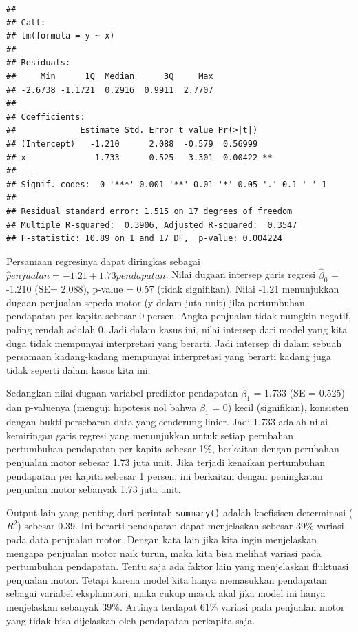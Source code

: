 \documentclass[
]{book}
\begin{document}
\begin{verbatim}
## 
## Call:
## lm(formula = y ~ x)
## 
## Residuals:
##     Min      1Q  Median      3Q     Max 
## -2.6738 -1.1721  0.2916  0.9911  2.7707 
## 
## Coefficients:
##             Estimate Std. Error t value Pr(>|t|)   
## (Intercept)   -1.210      2.088  -0.579  0.56999   
## x              1.733      0.525   3.301  0.00422 **
## ---
## Signif. codes:  0 '***' 0.001 '**' 0.01 '*' 0.05 '.' 0.1 ' ' 1
## 
## Residual standard error: 1.515 on 17 degrees of freedom
## Multiple R-squared:  0.3906, Adjusted R-squared:  0.3547 
## F-statistic: 10.89 on 1 and 17 DF,  p-value: 0.004224
\end{verbatim}

Persamaan regresinya dapat diringkas sebagai \(\hat penjualan=-1.21+1.73pendapatan\). Nilai dugaan intersep garis regresi \(\hat \beta_0\) = -1.210 (SE= 2.088), p-value = 0.57 (tidak signifikan). Nilai -1,21 menunjukkan dugaan penjualan sepeda motor (y dalam juta unit) jika pertumbuhan pendapatan per kapita sebesar 0 persen. Angka penjualan tidak mungkin negatif, paling rendah adalah 0. Jadi dalam kasus ini, nilai intersep dari model yang kita duga tidak mempunyai interpretasi yang berarti. Jadi intersep di dalam sebuah persamaan kadang-kadang mempunyai interpretasi yang berarti kadang juga tidak seperti dalam kasus kita ini.

Sedangkan nilai dugaan variabel prediktor pendapatan \(\hat \beta_1\) = 1.733 (SE = 0.525) dan p-valuenya (menguji hipotesis nol bahwa \(\beta_1\) = 0) kecil (signifikan), konsisten dengan bukti persebaran data yang cenderung linier. Jadi 1.733 adalah nilai kemiringan garis regresi yang menunjukkan untuk setiap perubahan pertumbuhan pendapatan per kapita sebesar 1\%, berkaitan dengan perubahan penjualan motor sebesar 1.73 juta unit. Jika terjadi kenaikan pertumbuhan pendapatan per kapita sebesar 1 persen, ini berkaitan dengan peningkatan penjualan motor sebanyak 1.73 juta unit.

Output lain yang penting dari perintah \texttt{summary()} adalah koefisisen determinasi (\(R^2\)) sebesar 0.39. Ini berarti pendapatan dapat menjelaskan sebesar 39\% variasi pada data penjualan motor. Dengan kata lain jika kita ingin menjelaskan mengapa penjualan motor naik turun, maka kita bisa melihat variasi pada pertumbuhan pendapatan. Tentu saja ada faktor lain yang menjelaskan fluktuasi penjualan motor. Tetapi karena model kita hanya memasukkan pendapatan sebagai variabel eksplanatori, maka cukup masuk akal jika model ini hanya menjelaskan sebanyak 39\%. Artinya terdapat 61\% variasi pada penjualan motor yang tidak bisa dijelaskan oleh pendapatan perkapita saja.
\end{document}
